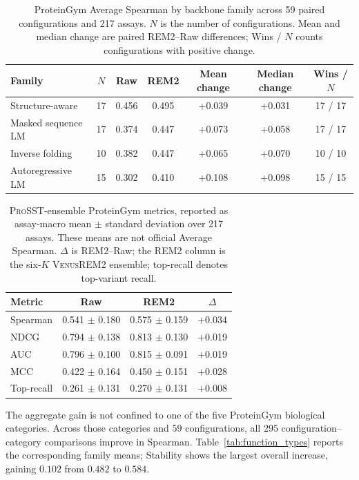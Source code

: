 \documentclass{article} %
\begin{document}
\begin{table}[!ht]
\caption{ProteinGym Average Spearman by backbone family across 59 paired configurations and 217 assays. $N$ is the number of configurations. Mean and median change are paired \textsc{REM2}--Raw differences; Wins / $N$ counts configurations with positive change.}
\label{tab:proteingym}
\begin{center}
\footnotesize
\setlength{\tabcolsep}{4pt}
\begin{tabular}{lcccccc}
\toprule
Family & $N$ & Raw & \textsc{REM2} & Mean change & Median change & Wins / $N$ \\
\midrule
Structure-aware & 17 & 0.456 & 0.495 & +0.039 & +0.031 & 17 / 17 \\
Masked sequence LM & 17 & 0.374 & 0.447 & +0.073 & +0.058 & 17 / 17 \\
Inverse folding & 10 & 0.382 & 0.447 & +0.065 & +0.070 & 10 / 10 \\
Autoregressive LM & 15 & 0.302 & 0.410 & +0.108 & +0.098 & 15 / 15 \\
\bottomrule
\end{tabular}
\end{center}
\end{table}

\begin{table}[!ht]
\caption{\textsc{ProSST}-ensemble ProteinGym metrics, reported as assay-macro mean $\pm$ standard deviation over 217 assays. These means are not official Average Spearman. $\Delta$ is \textsc{REM2}--Raw; the \textsc{REM2} column is the six-$K$ \textsc{VenusREM2} ensemble; top-recall denotes top-variant recall.}
\label{tab:prosst_metrics}
\centering
\small
\setlength{\tabcolsep}{9pt}
\begin{tabular}{lccc}
\toprule
Metric & Raw & \textsc{REM2} & $\Delta$ \\
\midrule
Spearman & 0.541 $\pm$ 0.180 & 0.575 $\pm$ 0.159 & +0.034 \\
NDCG & 0.794 $\pm$ 0.138 & 0.813 $\pm$ 0.130 & +0.019 \\
AUC & 0.796 $\pm$ 0.100 & 0.815 $\pm$ 0.091 & +0.019 \\
MCC & 0.422 $\pm$ 0.164 & 0.450 $\pm$ 0.151 & +0.028 \\
Top-recall & 0.261 $\pm$ 0.131 & 0.270 $\pm$ 0.131 & +0.008 \\
\bottomrule
\end{tabular}
\end{table}

The aggregate gain is not confined to one of the five ProteinGym biological categories. Across those categories and $59$ configurations, all $295$ configuration--category comparisons improve in Spearman. Table~\ref{tab:function_types} reports the corresponding family means; Stability shows the largest overall increase, gaining $0.102$ from $0.482$ to $0.584$.
\end{document}
